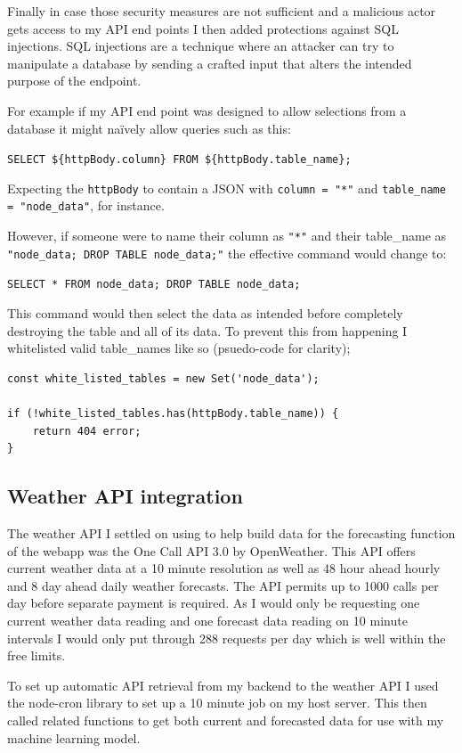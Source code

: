 Finally in case those security measures are not sufficient and a malicious actor
gets access to my API end points I then added protections against SQL
injections. SQL injections are a technique where an attacker can try to
manipulate a database by sending a crafted input that alters the intended
purpose of the endpoint.

For example if my API end point was designed to allow selections from a database
it might naïvely allow queries such as this:

\verb|SELECT ${httpBody.column} FROM ${httpBody.table_name};|

Expecting the \verb|httpBody| to contain a JSON with \texttt{column = "*"} and
\texttt{table\_name = "node\_data"}, for instance. 

However, if someone were to name their column as \texttt{"*"} and their
table\_name as \texttt{"node\_data; DROP TABLE node\_data;"} the effective command
would change to:

\verb|SELECT * FROM node_data; DROP TABLE node_data;|

This command would then select the data as intended before completely destroying
the table and all of its data. To prevent this from happening I whitelisted
valid table\_names like so (psuedo-code for clarity);

\begin{verbatim}
const white_listed_tables = new Set('node_data');

if (!white_listed_tables.has(httpBody.table_name)) {
    return 404 error;
}
\end{verbatim}



\subsection{Weather API integration}

The weather API I settled on using to help build data for the forecasting
function of the webapp was the One Call API 3.0 by OpenWeather. This API offers
current weather data at a 10 minute resolution as well as 48 hour ahead hourly
and 8 day ahead daily weather forecasts. The API permits up to 1000 calls per
day before separate payment is required. As I would only be requesting one
current weather data reading and one forecast data reading on 10 minute
intervals I would only put through 288 requests per day which is well within the
free limits.

To set up automatic API retrieval from my backend to the weather API I used the
node-cron library to set up a 10 minute job on my host server. This then called
related functions to get both current and forecasted data for use with my
machine learning model.

